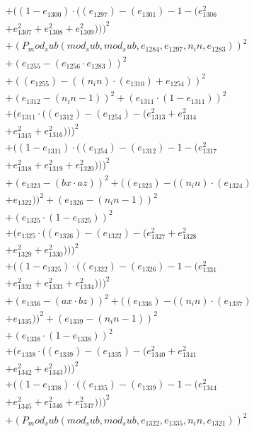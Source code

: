 \documentclass[10pt, a4paper]{article}
\begin{document}
\begin{align*}
& + ((1 - e_{1300})  \cdot  ((e_{1297}) - (e_{1301}) - 1 - (e_{1306}^{2} \\
& + e_{1307}^{2} + e_{1308}^{2} + e_{1309}^{2})))^{2} \\
& + (P_mod_sub(mod_sub, mod_sub, e_{1284}, e_{1297}, n_in, e_{1283}))^{2} \\
& + (e_{1255} - (e_{1256}  \cdot  e_{1283}))^{2} \\
& + ((e_{1255}) - ((n_in)  \cdot  (e_{1310}) + e_{1254}))^{2} \\
& + (e_{1312} - (n_in - 1))^{2} + (e_{1311}  \cdot  (1 - e_{1311}))^{2} \\
& + (e_{1311}  \cdot  ((e_{1312}) - (e_{1254}) - (e_{1313}^{2} + e_{1314}^{2} \\
& + e_{1315}^{2} + e_{1316}^{2})))^{2} \\
& + ((1 - e_{1311})  \cdot  ((e_{1254}) - (e_{1312}) - 1 - (e_{1317}^{2} \\
& + e_{1318}^{2} + e_{1319}^{2} + e_{1320}^{2})))^{2} \\
& + (e_{1323} - (bx  \cdot  az))^{2} + ((e_{1323}) - ((n_in)  \cdot  (e_{1324}) \\
& + e_{1322}))^{2} + (e_{1326} - (n_in - 1))^{2} \\
& + (e_{1325}  \cdot  (1 - e_{1325}))^{2} \\
& + (e_{1325}  \cdot  ((e_{1326}) - (e_{1322}) - (e_{1327}^{2} + e_{1328}^{2} \\
& + e_{1329}^{2} + e_{1330}^{2})))^{2} \\
& + ((1 - e_{1325})  \cdot  ((e_{1322}) - (e_{1326}) - 1 - (e_{1331}^{2} \\
& + e_{1332}^{2} + e_{1333}^{2} + e_{1334}^{2})))^{2} \\
& + (e_{1336} - (ax  \cdot  bz))^{2} + ((e_{1336}) - ((n_in)  \cdot  (e_{1337}) \\
& + e_{1335}))^{2} + (e_{1339} - (n_in - 1))^{2} \\
& + (e_{1338}  \cdot  (1 - e_{1338}))^{2} \\
& + (e_{1338}  \cdot  ((e_{1339}) - (e_{1335}) - (e_{1340}^{2} + e_{1341}^{2} \\
& + e_{1342}^{2} + e_{1343}^{2})))^{2} \\
& + ((1 - e_{1338})  \cdot  ((e_{1335}) - (e_{1339}) - 1 - (e_{1344}^{2} \\
& + e_{1345}^{2} + e_{1346}^{2} + e_{1347}^{2})))^{2} \\
& + (P_mod_sub(mod_sub, mod_sub, e_{1322}, e_{1335}, n_in, e_{1321}))^{2} \\

\end{align*}
\end{document}
